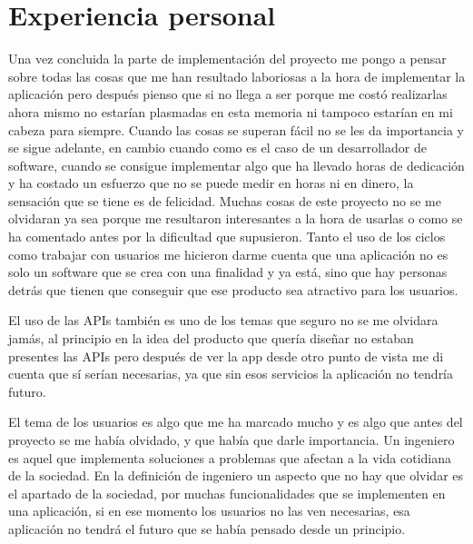 \section{Experiencia personal}
\label{secc:Experiencia personal}

Una vez concluida la parte de implementación del proyecto me pongo a pensar sobre todas las cosas que me han resultado laboriosas a la hora de implementar la aplicación pero después pienso que si no llega a ser porque me costó realizarlas ahora mismo no estarían plasmadas en esta memoria ni tampoco estarían en mi cabeza para siempre. Cuando las cosas se superan fácil no se les da importancia y se sigue adelante, en cambio cuando como es el caso de un desarrollador de software, cuando se consigue implementar algo que ha llevado horas de dedicación y ha costado un esfuerzo que no se puede medir en horas ni en dinero, la sensación que se tiene es de felicidad. Muchas cosas de este proyecto no se me olvidaran ya sea porque me resultaron interesantes a la hora de usarlas o como se ha comentado antes por la dificultad que supusieron. Tanto el uso de los ciclos como trabajar con usuarios me hicieron darme cuenta que una aplicación no es solo un software que se crea con una finalidad y ya está, sino que hay personas detrás que tienen que conseguir que ese producto sea atractivo para los usuarios. 

El uso de las APIs también es uno de los temas que seguro no se me olvidara jamás, al principio en la idea del producto que quería diseñar no estaban presentes las APIs pero después de ver la app desde otro punto de vista me di cuenta que sí serían necesarias, ya que sin esos servicios la aplicación no tendría futuro.

El tema de los usuarios es algo que me ha marcado mucho y es algo que antes del proyecto se me había olvidado, y que había que darle importancia. Un ingeniero es aquel que implementa soluciones a problemas que afectan a la vida cotidiana de la sociedad. En la definición de ingeniero un aspecto que no hay que olvidar es el apartado de la sociedad, por muchas funcionalidades que se implementen en una aplicación, si en ese momento los usuarios no las ven necesarias, esa aplicación no tendrá el futuro que se había pensado desde un principio.
